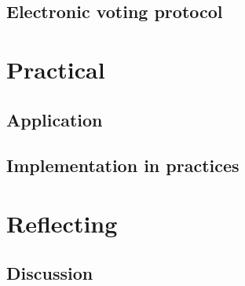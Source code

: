 \documentclass[a4paper]{report}
\theoremstyle{plain}
\begin{document}
\chapter{Electronic voting protocol}
    


\part{Practical}
\clearpage
\chapter{Application}
    
    
    
    
    
    
    
    
    
    
    
        
    
    
\clearpage
\chapter{Implementation in practices}
    

    

    

    

\part{Reflecting}    
\clearpage    
\chapter{Discussion}
\end{document}

